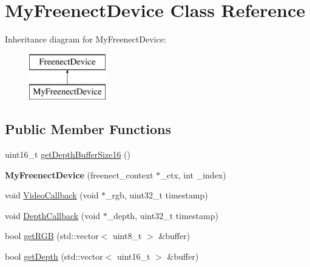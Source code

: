 \hypertarget{class_my_freenect_device}{}\section{My\+Freenect\+Device Class Reference}
\label{class_my_freenect_device}
Inheritance diagram for My\+Freenect\+Device\+:\begin{figure}[H]
\begin{center}
\leavevmode
\includegraphics[height=2.000000cm]{class_my_freenect_device}
\end{center}
\end{figure}
\subsection*{Public Member Functions}
\begin{DoxyCompactItemize}
\item 
uint16\+\_\+t \hyperlink{class_my_freenect_device_ad6393488b43e6aa249c01778c8355fdf}{get\+Depth\+Buffer\+Size16} ()
\item 
\hypertarget{class_my_freenect_device_aac1e6d4b32dd78faa4e8183542275f67}{}\label{class_my_freenect_device_aac1e6d4b32dd78faa4e8183542275f67} 
{\bfseries My\+Freenect\+Device} (freenect\+\_\+context $\ast$\+\_\+ctx, int \+\_\+index)
\item 
void \hyperlink{class_my_freenect_device_adbe3befb3e1548044b747b25a2adc126}{Video\+Callback} (void $\ast$\+\_\+rgb, uint32\+\_\+t timestamp)
\item 
void \hyperlink{class_my_freenect_device_a8f2e6948134273dcc72d38d24acd05e3}{Depth\+Callback} (void $\ast$\+\_\+depth, uint32\+\_\+t timestamp)
\item 
bool \hyperlink{class_my_freenect_device_afead2e01130913c50376e3439036aed8}{get\+R\+GB} (std\+::vector$<$ uint8\+\_\+t $>$ \&buffer)
\item 
bool \hyperlink{class_my_freenect_device_a657260af4e8e86746de4e33ce14352b7}{get\+Depth} (std\+::vector$<$ uint16\+\_\+t $>$ \&buffer)
\end{DoxyCompactItemize}
